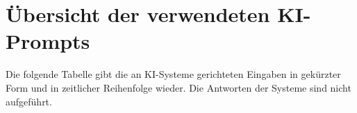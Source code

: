 \section{\"Ubersicht der verwendeten KI-Prompts}
\label{anhangPrompts}

Die folgende Tabelle gibt die an KI-Systeme gerichteten Eingaben in gek\"urzter Form und in zeitlicher Reihenfolge wieder. Die Antworten der Systeme sind nicht aufgef\"uhrt.

